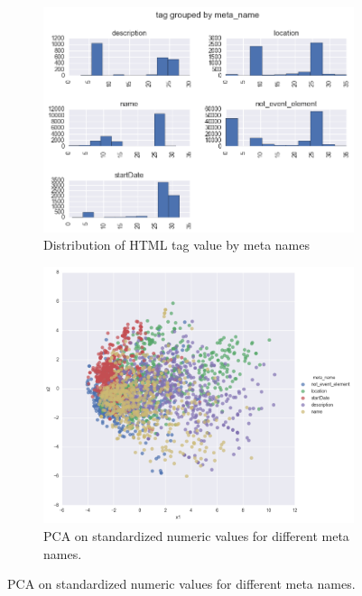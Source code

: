 \begin{figure}[h]
\begin{subfigure}{.5\textwidth}
  \centering
  \includegraphics[width=1\textwidth]{figures07/distrTagByMeta}
  \caption{Distribution of HTML tag value by meta names}
  \label{fig:distrTagByMeta}
\end{subfigure}
\begin{subfigure}{.5\textwidth}
  \centering
    \includegraphics[width=1\textwidth]{figures07/pcatsne}
    \caption{PCA on standardized numeric values for different meta names.}
    \label{fig:pcatsne}
\end{subfigure}
\end{figure}

